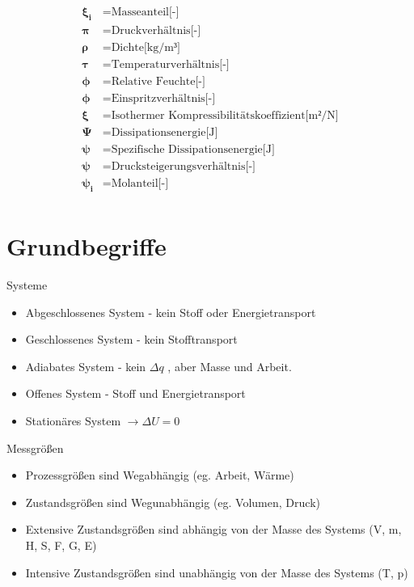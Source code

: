 \documentclass[twocolumn]{article}
\begin{document}
\begin{align*}
	\mathbf{\xi_i}		&=	\text{Masseanteil[-]} \\
	\mathbf{\pi}		&=	\text{Druckverhältnis[-]} \\
	\mathbf{\rho}		&=	\text{Dichte[kg/m³]} \\
	\mathbf{\tau}		&=	\text{Temperaturverhältnis[-]} \\
	\mathbf{\phi}		&=	\text{Relative Feuchte[-]} \\
	\mathbf{\phi}		&=	\text{Einspritzverhältnis[-]} \\
	\mathbf{\xi}		&=	\text{Isothermer Kompressibilitätskoeffizient[m²/N]} \\
	\mathbf{\Psi}		&=	\text{Dissipationsenergie[J]} \\
	\mathbf{\psi}		&=	\text{Spezifische Dissipationsenergie[J]} \\
	\mathbf{\psi}		&=	\text{Drucksteigerungsverhältnis[-]} \\
	\mathbf{\psi_i}		&=	\text{Molanteil[-]} \\
\end{align*}

\pagebreak 

\section{Grundbegriffe}

Systeme 
\begin{itemize}
	\item Abgeschlossenes System - kein Stoff oder Energietransport
	\item Geschlossenes System - kein Stofftransport
	\item Adiabates System - kein $\Delta q$ , aber Masse und Arbeit.
	\item Offenes System - Stoff und Energietransport
	\item Stationäres System $\rightarrow \Delta U = 0$
\end{itemize}

Messgrößen
\begin{itemize}
	\item Prozessgrößen sind Wegabhängig (eg. Arbeit, Wärme)
	\item Zustandsgrößen sind Wegunabhängig (eg. Volumen, Druck)
	\item Extensive Zustandsgrößen sind abhängig von der Masse des Systems (V, m, H, S, F, G, E)
	\item Intensive Zustandsgrößen sind unabhängig von der Masse des Systems (T, p)
\end{itemize}
\end{document}
